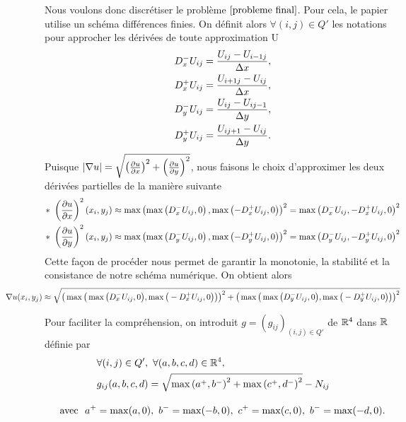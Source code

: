Nous voulons donc discrétiser le problème $\eqref{probleme final}$.  Pour cela, le papier utilise un schéma différences finies. On définit alors $\forall (i,j)\in Q'$ les notations pour approcher les dérivées de toute approximation U
\begin{equation*}
    \begin{split}
        D_x^-U_{ij} &= \frac{U_{ij}-U_{i-1j}}{\Delta x},\\
        D_x^+U_{ij} &= \frac{U_{i+1j}-U_{ij}}{\Delta x},\\
        D_y^-U_{ij} &= \frac{U_{ij}-U_{ij-1}}{\Delta y},\\
        D_y^+U_{ij} &= \frac{U_{ij+1}-U_{ij}}{\Delta y}.    
    \end{split}
\end{equation*}
Puisque $\mathopen{}\left|\nabla u\right|\mathclose{} = \sqrt{\left(\frac{\mathop{}\!{\partial} u}{\mathop{}\!{\partial} x}\right)^2+\left(\frac{\mathop{}\!{\partial} u}{\mathop{}\!{\partial} y}\right)^2}$, nous faisons le choix d'approximer les deux dérivées partielles de la manière suivante
\begin{equation*}
    \begin{split}
        \ast \  \left(\frac{\mathop{}\!{\partial} u}{\mathop{}\!{\partial} x}\right)^2(x_i,y_j) \approx \max\left(\max\left(D_x^-U_{ij},0\right),\max\left(-D_x^+U_{ij},0\right)\right)^2 =\max\left(D_x^-U_{ij},-D_x^+U_{ij},0\right)^2\\
        \ast \ \left(\frac{\mathop{}\!{\partial} u}{\mathop{}\!{\partial} y}\right)^2(x_i,y_j) \approx \max\left(\max\left(D_y^-U_{ij},0\right),\max\left(-D_y^+U_{ij},0\right)\right)^2 =\max\left(D_y^-U_{ij},-D_y^+U_{ij},0\right)^2
    \end{split}
\end{equation*}
Cette façon de procéder nous permet de garantir la monotonie, la stabilité et la consistance de notre schéma numérique. On obtient alors
\begin{equation*}
    \hspace*{-1.7cm}\nabla u(x_i,y_j) \approx \sqrt{
        \big(
            \max\big(
                \max\big(D_x^-\Uij,0\big),\max\big(-D_x^+\Uij,0\big)            
            \big)
        \big)^2
        +
        \big(
            \max\big(
                \max\big(D_y^-\Uij,0\big),\max\big(-D_y^+\Uij,0\big)            
            \big)
        \big)^2
    }
\end{equation*}

Pour faciliter la compréhension, on introduit $g=(g_{ij})_{(i,j)\in Q'}$ de $\mathbb{R}^4$ dans $\mathbb{R}$ définie par 
\begin{align*}
    &\forall (i,j)\in Q', \ \forall (a,b,c,d)\in \R^4,\\
    &g_{ij}(a,b,c,d) = \sqrt{\max\left(a^+,b^-\right)^2 + \max\left(c^+,d^-\right)^2} - N_{ij}\\[1em]
    \text{avec} \ \  a^+&=\max(a,0),\ b^-=\max(-b,0),\ c^+=\max(c,0),\ b^-=\max(-d,0).
\end{align*}

